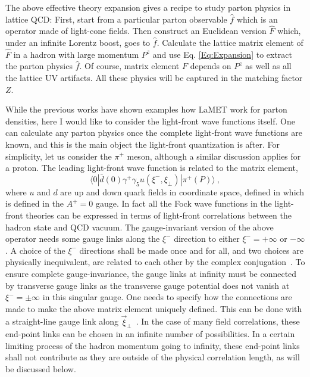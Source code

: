 \documentclass[aps,prd,preprint,tightenlines,superscriptaddress]{revtex4}
\begin{document}
The above effective theory expansion gives a recipe to study parton physics in lattice QCD: 
First, start from a particular parton observable $\hat f$ which is an operator made of 
light-cone fields. Then construct an
Euclidean version $\hat F$ which, under an infinite Lorentz boost, goes to $\hat f$. Calculate the lattice matrix element
of $\hat F$ in a hadron with large momentum $P^z$ and use Eq. \ref{Eq:Expansion} to extract the parton physics $\hat f$.
Of course, matrix element $F$ depends on $P^z$ as well as all the lattice UV artifacts. All these physics will be
captured in the matching factor $Z$.

While the previous works have shown examples how LaMET work for parton densities, here I would like to
consider the light-front wave functions itself. One can calculate any parton physics once the complete 
light-front wave functions are known, and this is the main object the light-front quantization is after. 
For simplicity, let us consider the $\pi^+$ meson, although a similar discussion applies for a proton.
The leading light-front wave function is related to the matrix element,
\begin{equation}
  \langle 0|\bar d(0)\gamma^+\gamma_5 u(\xi^-,\xi_\perp)|\pi^+(P)\rangle \ , 
\label{Eq:meson}
\end{equation}
where $u$ and $d$ are up and down quark fields in coordinate space, defined in 
which is defined in the $A^+=0$ gauge. In fact all the Fock wave functions in the light-front theories
can be expressed in terms of light-front correlations between the hadron state and QCD vacuum. 
The gauge-invariant version of the above operator
needs some gauge links along the $\xi^-$ direction to either $\xi^- =+\infty$ or $-\infty$.
A choice of the $\xi^-$ directions shall be made once and for all, and two choices are
physically inequivalent, are related to each other by the complex conjugation~\cite{Ji:2002xn,Ji:2003yj}. 
To ensure complete gauge-invariance, the gauge links at infinity must be connected
by transverse gauge links as the transverse gauge potential does not vanish at $\xi^-=\pm \infty$ in this
singular gauge. One needs to specify how the connections are made to make
the above matrix element uniquely defined. This can be done with a straight-line gauge link 
along $\vec{\xi}_\perp$~\cite{Ji:2002aa}. In the case of many field correlations, 
these end-point links can be chosen in an infinite number of possibilities. 
In a certain limiting process of the hadron momentum 
going to infinity, these end-point links shall not contribute as they are outside of the
physical correlation length, as will be discussed below. 
\end{document}
